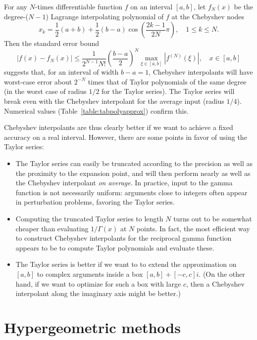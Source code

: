 \documentclass[reqno]{amsart}
\theoremstyle{definition}
\begin{document}
For any $N$-times differentiable function $f$ on an interval $[a,b]$, let $f_N(x)$ be the degree-($N-1$)
Lagrange interpolating polynomial of $f$ at the Chebyshev nodes
\begin{equation}
x_k = \frac{1}{2}(a+b) + \frac{1}{2} (b-a) \cos\!\left(\frac{2k-1}{2N}\pi\right), \quad 1 \le k \le N.
\end{equation}
Then the standard error bound
\begin{equation}
|f(x) - f_{N}(x)| \le \frac{1}{2^{N-1} N!} \left( \frac{b-a}{2} \right)^N \max_{\xi \in [a,b]} | f^{(N)}(\xi) |, \quad x \in [a, b]
\end{equation}
suggests that, for an interval of width $b-a = 1$,
Chebyshev interpolants will have worst-case error
about $2^{-N}$ times that of Taylor polynomials of the same degree
(in the worst case of radius $1/2$ for the Taylor series).
The Taylor series will
break even with the Chebyshev interpolant for the average input (radius $1/4$).
Numerical values (Table~\ref{table:tabpolyapprox}) confirm this.

Chebyshev interpolants are thus clearly better if we want
to achieve a fixed accuracy on a real interval.
However, there are some points in favor of using the Taylor series:
\begin{itemize}
\item The Taylor series
can easily be truncated according to the precision as well as
the proximity to the expansion point,
and will then perform nearly as well
as the Chebyshev interpolant \emph{on average}.
In practice, input to the gamma function is not necessarily uniform:
arguments close to integers often appear in perturbation problems,
favoring the Taylor series.
\item Computing the truncated Taylor series to length $N$ turns out
to be somewhat cheaper than evaluating $1/\Gamma(x)$ at $N$ points.
In fact, the most efficient way to construct Chebyshev interpolants
for the reciprocal gamma function appears to be to compute
Taylor polynomials and evaluate these.
\item The Taylor series is better if we want to to extend the approximation on $[a,b]$ to complex arguments inside a box $[a,b] + [-c,c] i$. (On the other hand, if we want to optimize for such a box with large $c$, then a Chebyshev interpolant along the imaginary axis might be better.)
\end{itemize}



\section{Hypergeometric methods}
\end{document}
